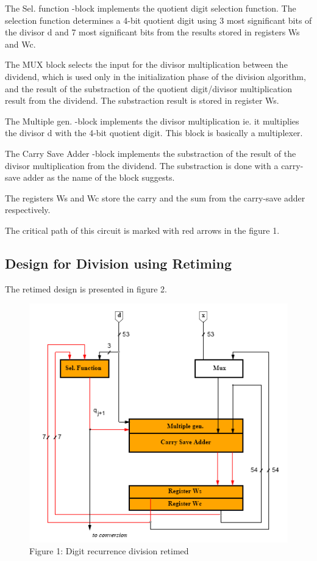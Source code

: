 \documentclass[11pt,a4paper]{article}
\begin{document}
The Sel. function -block implements the quotient digit selection function. The selection function determines a 4-bit quotient digit using 3 most significant bits of the divisor d and 7 most significant bits from the results stored in registers Ws and Wc.

The MUX block selects the input for the divisor multiplication between the dividend, which is used only in the initialization phase of the division algorithm, and the result of the substraction of the quotient digit/divisor multiplication result from the dividend. The substraction result is stored in register Ws.

The Multiple gen. -block implements the divisor multiplication ie. it multiplies the divisor d with the 4-bit quotient digit. This block is basically a multiplexer.

The Carry Save Adder -block implements the substraction of the result of the divisor multiplication from the dividend. The substraction is done with a carry-save adder as the name of the block suggests.

The registers Ws and Wc store the carry and the sum from the carry-save adder respectively.

The critical path of this circuit is marked with red arrows in the figure 1.

\subsection{Design for Division using Retiming}
The retimed design is presented in figure 2.

\begin{figure}
	\centering
		\includegraphics{./noretiming.PNG}
	\caption{Figure 1: Digit recurrence division retimed}
	\label{fig:retiming}
\end{figure}
\end{document}
